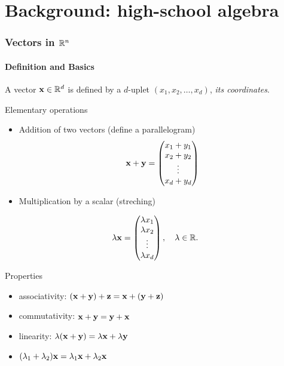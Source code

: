 \section{Background: high-school algebra}

\begin{frame}
  \frametitle{Vectors in $\mathbb{R}^n$}
  \framesubtitle{Definition and Basics}

   A vector $\mathbf{x}\in\mathbb{R}^d$ is defined by a $d$-uplet $(x_1, x_2, \dots, x_d)$, \textit{its coordinates}.

  \begin{block}{Elementary operations}
  \vspace{-.5cm}
  \begin{multicols}{2}
   \begin{itemize}
    \item Addition of two vectors (define a parallelogram)
    \begin{equation*}
    \mathbf{x} + \mathbf{y} = \begin{pmatrix}
    x_1 + y_1 \\ x_2 + y_2 \\ \vdots \\ x_d + y_d
    \end{pmatrix}
  \end{equation*}
    \item Multiplication by a scalar (streching)
   \end{itemize}
  \begin{equation*}
    \lambda \mathbf{x} = \begin{pmatrix}
    \lambda x_1 \\ \lambda x_2 \\ \vdots \\ \lambda x_d
    \end{pmatrix}, \quad \lambda \in \mathbb{R}.
  \end{equation*}
  \end{multicols}
  \end{block}

  \begin{block}{Properties}
  \vspace{-.5cm}
  \begin{multicols}{2}
    \begin{itemize}
      \item associativity: $(\mathbf{x} + \mathbf{y}) + \mathbf{z} = \mathbf{x} + (\mathbf{y} + \mathbf{z})$
      \item commutativity: $\mathbf{x} + \mathbf{y} = \mathbf{y} + \mathbf{x}$
      \item linearity: $\lambda (\mathbf{x} + \mathbf{y}) = \lambda \mathbf{x} + \lambda \mathbf{y}$
      \item $(\lambda_1 + \lambda_2) \mathbf{x} = \lambda_1\mathbf{x} + \lambda_2 \mathbf{x}$
    \end{itemize}  
  \end{multicols}
  \end{block}
  
\end{frame}

